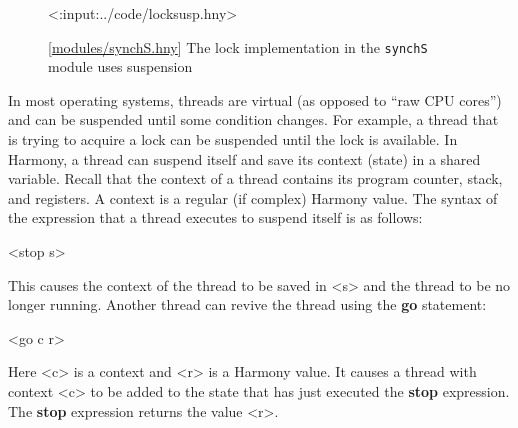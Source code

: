 \documentclass{report}
\newcommand{\harmonylink}[1]{%
[\href{https://harmony.cs.cornell.edu/#1}{\underline{#1}}]%
}
\newenvironment{code}{
\tcolorbox
}{
\endtcolorbox
}
\begin{document}
\begin{figure}
\begin{code}
<{:input:../code/locksusp.hny}>
\end{code}
\caption{\harmonylink{modules/synchS.hny} The lock implementation in the \texttt{synchS} module uses suspension}
\label{fig:suspension}
\end{figure}

In most operating systems, threads are virtual (as opposed to ``raw CPU cores'')
and can be suspended until some condition changes.
For example, a thread that is trying to acquire a lock can be suspended until the lock is
available.
In Harmony, a thread can suspend itself and save its context (state) in a
shared variable.  Recall that the context of a thread contains
its program counter, stack, and registers.
A context is a regular (if complex) Harmony value.
The syntax of the expression that a thread executes to suspend itself
is as follows:

\begin{code}
<{stop s}>
\end{code}

This causes the context of the thread to be saved in <{s}> and
the thread to be no longer running.
Another thread can revive the thread using the \textbf{go}
%
statement:

\begin{code}
<{go c r}>
\end{code}

Here <{c}> is a context and <{r}> is a Harmony value.
It causes a thread with context <{c}> to be added to the state that has
just executed the \textbf{stop}
%
expression.  The \textbf{stop} expression returns the value <{r}>.
\end{document}
